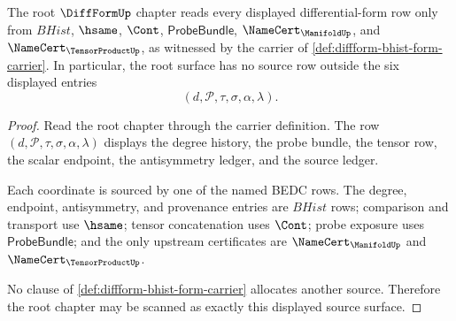 \begin{theorem}
\label{thm:diffform-root-source-obligation}
The root $\DiffFormUp$ chapter reads every displayed differential-form row
only from $BHist$, $\hsame$, $\Cont$, $\mathsf{ProbeBundle}$,
$\NameCert_{\ManifoldUp}$, and $\NameCert_{\TensorProductUp}$, as witnessed by
the carrier of \autoref{def:diffform-bhist-form-carrier}. In particular, the
root surface has no source row outside the six displayed entries
$$
(d,\mathcal{P},\tau,\sigma,\alpha,\lambda).
$$
\end{theorem}
\begin{proof}
Read the root chapter through the carrier definition. The row
$(d,\mathcal{P},\tau,\sigma,\alpha,\lambda)$ displays the degree history, the
probe bundle, the tensor row, the scalar endpoint, the antisymmetry ledger,
and the source ledger.

Each coordinate is sourced by one of the named BEDC rows. The degree,
endpoint, antisymmetry, and provenance entries are $BHist$ rows; comparison
and transport use $\hsame$; tensor concatenation uses $\Cont$; probe exposure
uses $\mathsf{ProbeBundle}$; and the only upstream certificates are
$\NameCert_{\ManifoldUp}$ and $\NameCert_{\TensorProductUp}$.

No clause of \autoref{def:diffform-bhist-form-carrier} allocates another
source. Therefore the root chapter may be scanned as exactly this displayed
source surface.
\end{proof}

